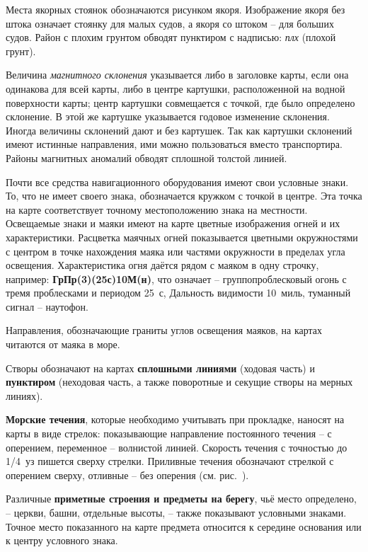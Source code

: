 Места якорных стоянок обозначаются рисунком якоря. Изображение якоря
без штока означает стоянку для малых судов, а якоря со штоком \--- для
больших судов. Район с плохим грунтом обводят пунктиром с надписью:
\textit{плх} (плохой грунт).

Величина \textit{магнитного склонения}
указывается либо в заголовке карты, если она одинакова для всей карты,
либо в центре картушки, расположенной на водной поверхности карты;
центр картушки совмещается с точкой, где было определено склонение. В
этой же картушке указывается годовое изменение склонения. Иногда
величины склонений дают и без картушек. Так как картушки склонений
имеют истинные направления, ими можно пользоваться вместо
транспортира. Районы магнитных аномалий обводят сплошной толстой
линией.

Почти все средства навигационного оборудования имеют свои условные
знаки. То, что не имеет своего знака, обозначается кружком с точкой в
центре. Эта точка на карте соответствует точному местоположению знака
на местности. Освещаемые знаки и маяки имеют на карте цветные
изображения огней и их характеристики. Расцветка маячных огней
показывается цветными окружностями с центром в точке нахождения маяка
или частями окружности в пределах угла освещения. Характеристика огня
даётся рядом с маяком в одну строчку, например:
\textbf{ГрПр(3)(25с)10М(н)}, что означает \--- группопроблесковый
огонь с тремя проблесками и периодом 25~с, Дальность видимости
10~миль, туманный сигнал \--- наутофон.

Направления, обозначающие граниты углов освещения маяков, на картах
читаются от маяка в море.

Створы обозначают на картах \textbf{сплошными линиями} (ходовая часть)
и \textbf{пунктиром} (неходовая часть, а также поворотные и секущие
створы на мерных линиях).

\textbf{Морские течения}, которые необходимо учитывать при прокладке,
наносят на карты в виде стрелок: показывающие направление постоянного
течения \--- с оперением, переменное \--- волнистой линией. Скорость
течения с точностью до 1/4~уз пишется сверху стрелки. Приливные
течения обозначают стрелкой с оперением сверху, отливные \--- без
оперения (см. рис.~).

Различные \textbf{приметные строения и предметы на берегу}, чьё место
определено, \--- церкви, башни, отдельные высоты, \--- также
показывают условными знаками. Точное место показанного на карте
предмета относится к середине основания или к центру условного знака.

